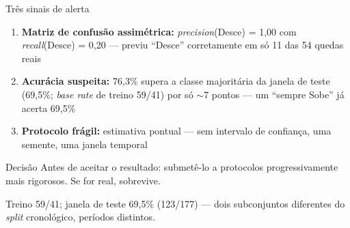 \documentclass[10pt,aspectratio=169]{beamer}
\begin{document}
\begin{frame}{Três sinais de alerta}
  \begin{enumerate}
    \item \textbf{Matriz de confusão assimétrica:} \textit{precision}(Desce) = 1{,}00 com \textit{recall}(Desce) = 0{,}20 --- previu ``Desce'' corretamente em só \alert{11 das 54 quedas reais}
    \item \textbf{Acurácia suspeita:} 76{,}3\% supera a classe majoritária da janela de teste (69{,}5\%; \textit{base rate} de treino 59/41) por só $\sim$7 pontos --- um ``sempre Sobe'' já acerta 69{,}5\%
    \item \textbf{Protocolo frágil:} estimativa pontual --- \alert{sem} intervalo de confiança, \alert{uma} semente, \alert{uma} janela temporal
  \end{enumerate}
  \vspace{1ex}
  \begin{block}{Decisão}
    Antes de aceitar o resultado: submetê-lo a protocolos progressivamente
    mais rigorosos. Se for real, sobrevive.
  \end{block}
  \vspace{0.5ex}
  {\footnotesize Treino 59/41; janela de teste 69{,}5\% (123/177) --- dois subconjuntos diferentes do \textit{split} cronológico, períodos distintos.}
\end{frame}
\end{document}
